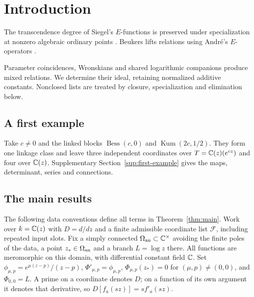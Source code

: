 \section{Introduction}\label{sec:introduction}

The transcendence degree of Siegel's $E$-functions \cite{Siegel1929}
is preserved under specialization at nonzero algebraic ordinary points \cite{Shidlovskii1989}.
Beukers lifts relations \cite[Theorems~1.1--1.3]{Beukers2006}
using Andr\'e's $E$-operators \cite{Andre2000I,Andre2000II}.

Parameter coincidences, Wronskians and shared logarithmic companions
produce mixed relations. We determine their ideal, retaining normalized
additive constants. Nonclosed lists are treated by closure, specialization and elimination below.

\subsection{A first example}
Take $c\ne0$ and the linked blocks $\operatorname{Bess}(c,0)$ and
$\operatorname{Kum}(2c,1/2)$. They form one linkage class and leave three independent coordinates
over $T=\mathbb{C}(z)(e^{cz})$ and four over $\mathbb{C}(z)$.
Supplementary Section~\ref{sup:first-example} gives the maps, determinant, series and connections.

\subsection{The main results}\label{subsec:normalization}
The following data conventions define all terms in Theorem~\ref{thm:main}.
Work over $k=\mathbb{C}(z)$ with $D=d/dz$ and a finite admissible coordinate list
$\mathcal F$, including repeated input slots. Fix a simply connected
$\Omega_{\rm an}\subset\mathbb{C}^\times$ avoiding the finite poles of the data,
a point $z_*\in\Omega_{\rm an}$ and a branch $L=\log z$ there.
All functions are meromorphic on this domain, with differential constant
field $\mathbb{C}$. Set $\phi_{\mu,p}=e^{\mu(z-p)}/(z-p)$,
$\Phi'_{\mu,p}=\phi_{\mu,p}$, $\Phi_{\mu,p}(z_*)=0$ for
$(\mu,p)\ne(0,0)$, and $\Phi_{0,0}=L$.
A prime on a coordinate denotes $D$; on a function of its own argument
it denotes that derivative, so $D[f_a(sz)]=sf'_a(sz)$.

